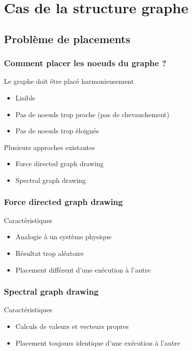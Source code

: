 \documentclass[handout]{beamer}
\begin{document}
\section{Cas de la structure graphe}
\subsection{Problème de placements}
\begin{frame}
  \frametitle{Comment placer les noeuds du graphe ?}

  \begin{block}{Le graphe doit être placé harmonieusement}
    \begin{itemize}
    \item Lisible
    \item Pas de noeuds trop proche (pas de chevauchement)
    \item Pas de noeuds trop éloignés
    \end{itemize}
  \end{block}

  \begin{block}{Plusieurs approches existantes}
    \begin{itemize}
    \item Force directed graph drawing
    \item Spectral graph drawing
    \end{itemize}
  \end{block}
\end{frame}

\begin{frame}
  \frametitle{Force directed graph drawing}

  \begin{block}{Caractéristiques}
    \begin{itemize}
    \item Analogie à un système physique
    \item Résultat trop aléatoire
    \item Placement différent d'une exécution à l'autre
    \end{itemize}
  \end{block}
\end{frame}

\begin{frame}
  \frametitle{Spectral graph drawing}

  \begin{block}{Caractéristiques}
    \begin{itemize}
    \item Calculs de valeurs et vecteurs propres
    \item Placement toujours identique d'une exécution à l'autre
    \end{itemize}
  \end{block}
\end{frame}
\end{document}
